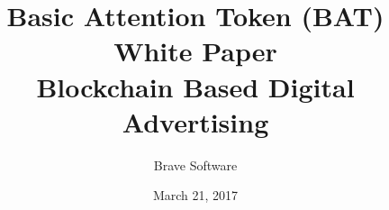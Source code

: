 \documentclass[11pt]{article}
\begin{document}
\title{%
Basic Attention Token (BAT) White Paper\\
\large Blockchain Based Digital Advertising}
\author{Brave Software}
\date{March 21, 2017}

\maketitle

\tableofcontents


\begin{abstract}

\end{abstract}
\end{document}
